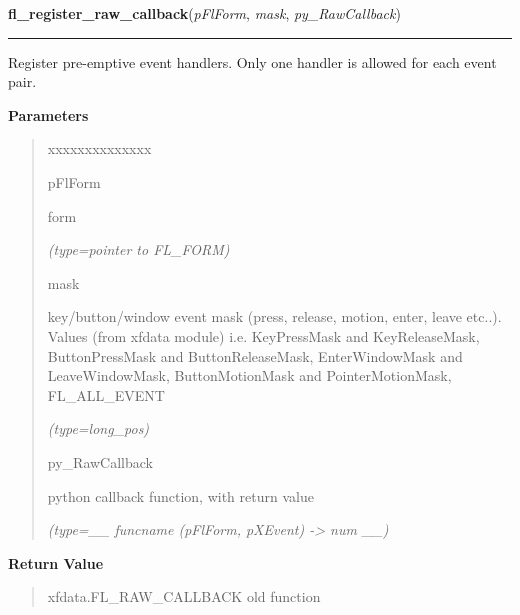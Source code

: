 \hspace{.8\funcindent}\begin{boxedminipage}{\funcwidth}

    \raggedright \textbf{fl\_register\_raw\_callback}(\textit{pFlForm}, \textit{mask}, \textit{py\_RawCallback})

    \vspace{-1.5ex}

    \rule{\textwidth}{0.5\fboxrule}
\setlength{\parskip}{2ex}
    Register pre-emptive event handlers. Only one handler is allowed for 
    each event pair.

\setlength{\parskip}{1ex}
      \textbf{Parameters}
      \vspace{-1ex}

      \begin{quote}
        \begin{Ventry}{xxxxxxxxxxxxxx}

          \item[pFlForm]

          form

            {\it (type=pointer to FL\_FORM)}

          \item[mask]

          key/button/window event mask (press, release, motion, enter, 
          leave etc..). Values (from xfdata module) i.e. KeyPressMask and 
          KeyReleaseMask, ButtonPressMask and ButtonReleaseMask, 
          EnterWindowMask and LeaveWindowMask, ButtonMotionMask and 
          PointerMotionMask, FL\_ALL\_EVENT

            {\it (type=long\_pos)}

          \item[py\_RawCallback]

          python callback function, with return value

            {\it (type=\_\_ funcname (pFlForm, pXEvent) -{\textgreater} num \_\_)}

        \end{Ventry}

      \end{quote}

      \textbf{Return Value}
    \vspace{-1ex}

      \begin{quote}
      xfdata.FL\_RAW\_CALLBACK old function

      \end{quote}


\end{boxedminipage}
